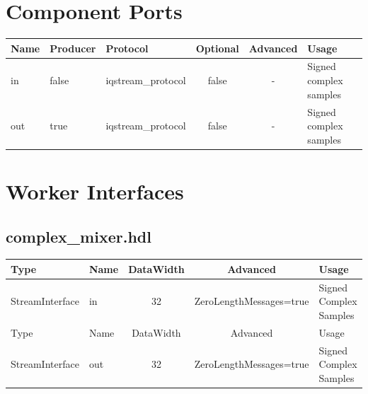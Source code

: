 \documentclass{article}
\def\comp{complex\_mixer}
\begin{document}
\begin{landscape}
	\section*{Component Ports}
	\begin{scriptsize}
		\begin{tabular}{|M{2cm}|M{1.5cm}|M{4cm}|c|c|M{9cm}|}
			\hline
			Name & Producer & Protocol           & Optional & Advanced & Usage                  \\
			\hline
			in   & false    & iqstream\_protocol & false    & -        & Signed complex samples \\
			\hline
			out  & true     & iqstream\_protocol & false    & -        & Signed complex samples \\
			\hline
		\end{tabular}
	\end{scriptsize}

	\section*{Worker Interfaces}
	\subsection*{\comp.hdl}
	\begin{scriptsize}
		\begin{tabular}{|M{2cm}|M{1.5cm}|c|c|M{12cm}|}
			\hline
			\rowcolor{blue}
			Type            & Name & DataWidth & Advanced                & Usage                  \\
			\hline
			StreamInterface & in   & 32        & ZeroLengthMessages=true & Signed Complex Samples \\
			\hline
			\rowcolor{blue}
			Type            & Name & DataWidth & Advanced                & Usage                  \\
			\hline
			StreamInterface & out  & 32        & ZeroLengthMessages=true & Signed Complex Samples \\
			\hline
		\end{tabular}
	\end{scriptsize}
\end{landscape}
\end{document}
